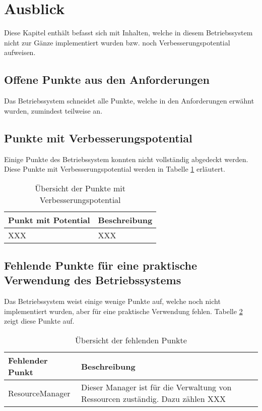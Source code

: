 \section{Ausblick}
Diese Kapitel enthält befasst sich mit Inhalten, welche in diesem Betriebssystem nicht zur Gänze implementiert wurden bzw. noch Verbesserungspotential aufweisen.

\subsection{Offene Punkte aus den Anforderungen}
Das Betriebssystem schneidet alle Punkte, welche in den Anforderungen erwähnt wurden, zumindest teilweise an.

\subsection{Punkte mit Verbesserungspotential}
Einige Punkte des Betriebssystem konnten nicht vollständig abgedeckt werden. Diese Punkte mit Verbesserungspotential werden in Tabelle \ref{table:points-to-improve} erläutert.

\begin{table}[H]
\begin{tabular}{p{5cm} | p{9cm}}
  \textbf{Punkt mit Potential} & \textbf{Beschreibung}
  \\ \hline
  XXX & XXX \\
  
 \end{tabular}
 \caption{Übersicht der Punkte mit Verbesserungspotential}
 \label{table:points-to-improve}
\end{table}

\subsection{Fehlende Punkte für eine praktische Verwendung des Betriebssystems}
Das Betriebssystem weist einige wenige Punkte auf, welche noch nicht implementiert wurden, aber für eine praktische Verwendung fehlen. Tabelle \ref{table:missing-points} zeigt diese Punkte auf.

\begin{table}[H]
\begin{tabular}{p{5cm} | p{9cm}}
  \textbf{Fehlender Punkt} & \textbf{Beschreibung}
  \\ \hline
  ResourceManager & Dieser Manager ist für die Verwaltung von Ressourcen zuständig. Dazu zählen XXX\\
  
 \end{tabular}
 \caption{Übersicht der fehlenden Punkte}
 \label{table:missing-points}
\end{table}

\pagebreak 